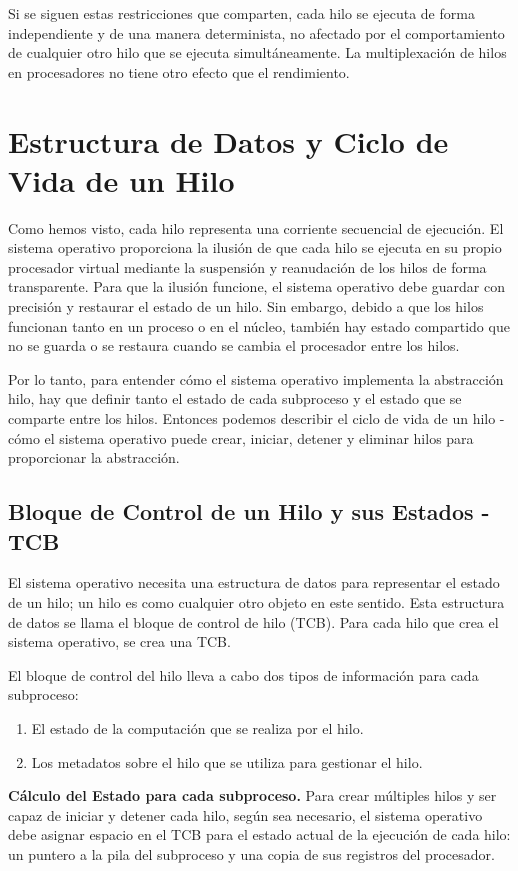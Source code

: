 \documentclass[10pt]{book}
\begin{document}
Si se siguen estas restricciones que comparten, cada hilo se ejecuta de forma independiente y de una manera determinista, no afectado por el comportamiento de cualquier otro hilo que se ejecuta simultáneamente. La multiplexación de hilos en procesadores no tiene otro efecto que el rendimiento.

\section{Estructura de Datos y Ciclo de Vida de un Hilo}
Como hemos visto, cada hilo representa una corriente secuencial de ejecución. El sistema operativo proporciona la ilusión de que cada hilo se ejecuta en su propio procesador virtual mediante la suspensión y reanudación de los hilos de forma transparente. Para que la ilusión funcione, el sistema operativo debe guardar con precisión y restaurar el estado de un hilo. Sin embargo, debido a que los hilos funcionan tanto en un proceso o en el núcleo, también hay estado compartido que no se guarda o se restaura cuando se cambia el procesador entre los hilos.

Por lo tanto, para entender cómo el sistema operativo implementa la abstracción hilo, hay que definir tanto el estado de cada subproceso y el estado que se comparte entre los hilos. Entonces podemos describir el ciclo de vida de un hilo - cómo el sistema operativo puede crear, iniciar, detener y eliminar hilos para proporcionar la abstracción.

\subsection{Bloque de Control de un Hilo y sus Estados - TCB}
El sistema operativo necesita una estructura de datos para representar el estado de un hilo; un hilo es como cualquier otro objeto en este sentido. Esta estructura de datos se llama el bloque de control de hilo (TCB). Para cada hilo que crea el sistema operativo, se crea una TCB.

El bloque de control del hilo lleva a cabo dos tipos de información para cada subproceso:
\begin{enumerate}
\item El estado de la computación que se realiza por el hilo.
\item Los metadatos sobre el hilo que se utiliza para gestionar el hilo.
\end{enumerate}

\textbf{Cálculo del Estado para cada subproceso.} Para crear múltiples hilos y ser capaz de iniciar y detener cada hilo, según sea necesario, el sistema operativo debe asignar espacio en el TCB para el estado actual de la ejecución de cada hilo: un puntero a la pila del subproceso y una copia de sus registros del procesador.
\end{document}
